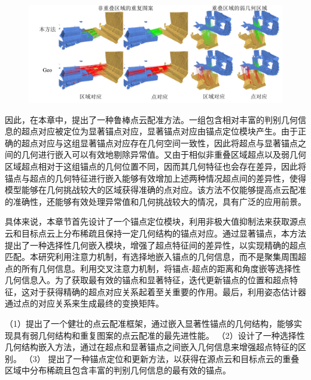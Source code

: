     \begin{figure}[h]
        \centering
        \includegraphics[width = \textwidth]{my/figure/3-1.pdf}
        \label{fig:example}
    \end{figure}
    \vspace{-0.35cm}

    因此，在本章中，提出了一种鲁棒点云配准方法。一组包含相对丰富的判别几何信息的超点对应被定位为显著锚点对应，显著锚点对应由锚点定位模块产生。由于正确的超点对应与这组显著锚点对应存在几何空间一致性，因此将超点与显著锚点之间的几何进行嵌入可以有效地剔除异常值。又由于相似非重叠区域超点以及弱几何区域超点相对于这组锚点的几何位置不同，因而其几何特征也会存在差异，因此将锚点与超点的几何特征进行嵌入能够有效增加上述两种情况超点间的差异性，使得模型能够在几何挑战较大的区域获得准确的点对应。该方法不仅能够提高点云配准的准确性，还能够有效处理异常值和几何挑战较大的情况，具有广泛的应用前景。

    具体来说，本章节首先设计了一个锚点定位模块，利用非极大值抑制法来获取源点云和目标点云上分布稀疏且保持一定几何结构的锚点对应。通过显著锚点，本方法提出了一种选择性几何嵌入模块，增强了超点特征间的差异性，以实现精确的超点匹配。本研究利用注意力机制，有选择地嵌入锚点的几何信息，而不是聚集周围超点的所有几何信息。利用交叉注意力机制，将锚点-超点的距离和角度嵌等选择性几何信息入。为了获取最有效的锚点和显著特征，迭代更新锚点的位置和超点特征，这对于获得精确的超点对应关系起着至关重要的作用。最后，利用姿态估计器通过点的对应关系来生成最终的变换矩阵。\par
    （1）提出了一个健壮的点云配准框架，通过嵌入显著性锚点的几何结构，能够实现具有弱几何结构和重复图案的点云配准的最先进性能。
    （2）设计了一种选择性几何结构嵌入方法，通过在超点和显著锚点之间嵌入几何信息来增强超点特征的区别。
    （3） 提出了一种锚点定位和更新方法，以获得在源点云和目标点云的重叠区域中分布稀疏且包含丰富的判别几何信息的最有效的锚点。

